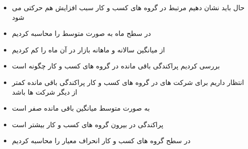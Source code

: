 \documentclass[12pt, a4paper]{article}
\begin{document}
\begin{itemize}
\item
حال باید نشان دهیم 
مرتبط در گروه های کسب و کار سبب افزایش هم حرکتی می شود
\item
{}
در سطح ماه به صورت متوسط 
را محاسبه کردیم
\item
از 
میانگین سالانه
و 
ماهانه بازار  در آن ماه را کم کردیم
\item
بررسی کردیم پراکندگی باقی مانده در گروه های کسب و کار چگونه است
\item
انتظار داریم برای شرکت های در  گروه های کسب و کار پراکندگی باقی مانده کمتر از دیگر شرکت ها باشد
	\lr{\begin{LTR}
	\begin{table}[htbp]
		\centering
		\resizebox{0.8\textwidth}{!}{
			
		}
		\label{tab:ResidualTrunSummary}
	\end{table}	
	\end{LTR}}
	\item
		به صورت متوسط میانگین باقی مانده صفر است
			\item
			پراکندگی در بیرون گروه های کسب و کار بیشتر است
				\item
				در سطح گروه های کسب و کار انحراف معیار را محاسبه کردیم
				

\end{itemize}
\end{document}

